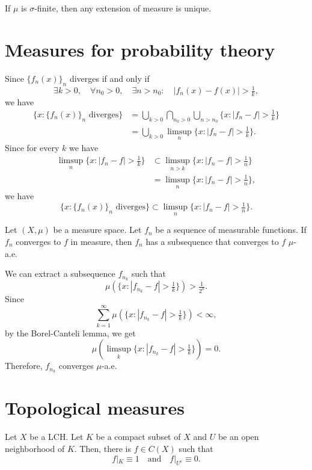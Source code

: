 \documentclass{../exp}
\begin{document}
\begin{prop}
If $\mu$ is $\sigma$-finite, then any extension of measure is unique.
\end{prop}

\section{Measures for probability theory}

Since $\{f_n(x)\}_n$ diverges if and only if
\[\exists k>0,\quad\forall n_0>0,\quad\exists n>n_0:\quad|f_n(x)-f(x)|>\tfrac1k,\]
we have
\begin{align*}
\{x:\{f_n(x)\}_n\text{ diverges}\}
&=\bigcup_{k>0}\bigcap_{n_0>0}\bigcup_{n>n_0}\{x:|f_n-f|>\tfrac1k\}\\
&=\bigcup_{k>0}\limsup_n\{x:|f_n-f|>\tfrac1k\}.
\end{align*}
Since for every $k$ we have
\begin{align*}
\limsup_n\{x:|f_n-f|>\tfrac1k\}
&\subset\limsup_{n>k}\{x:|f_n-f|>\tfrac1n\}\\
&=\limsup_n\{x:|f_n-f|>\tfrac1n\},
\end{align*}
we have
\[\{x:\{f_n(x)\}_n\text{ diverges}\}\subset\limsup_n\{x:|f_n-f|>\tfrac1n\}.\]




\begin{thm}
Let $(X,\mu)$ be a measure space.
Let $f_n$ be a sequence of measurable functions.
If $f_n$ converges to $f$ in measure, then $f_n$ has a subsequence that converges to $f$ $\mu$-a.e.
\end{thm}
\begin{pf}
We can extract a subsequence $f_{n_k}$ such that
\[\mu(\{x:|f_{n_k}-f|>\tfrac1k\})>\tfrac1{2^k}.\]
Since
\[\sum_{k=1}^\infty\mu(\{x:|f_{n_k}-f|>\tfrac1k\})<\infty,\]
by the Borel-Canteli lemma, we get
\[\mu(\limsup_k\{x:|f_{n_k}-f|>\tfrac1k\})=0.\]
Therefore, $f_{n_k}$ converges $\mu$-a.e.
\end{pf}




\section{Topological measures}

\begin{lem}
Let $X$ be a LCH.
Let $K$ be a compact subset of $X$ and $U$ be an open neighborhood of $K$.
Then, there is $f\in C(X)$ such that
\[f|_K\equiv1\quad\text{and}\quad f|_{U^c}\equiv0.\]
\end{lem}
\end{document}
